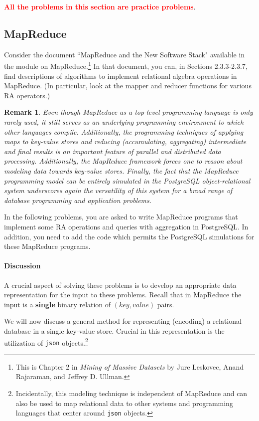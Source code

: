 \documentclass[10pt]{article}
\newtheorem{remark}{Remark}
\begin{document}
\textcolor{red}{\bf All the problems in this section are practice problems}.

\subsection{MapReduce}

Consider the document ``MapReduce and the New Software Stack" available in the module on MapReduce.\footnote{This is Chapter 2 in \emph{Mining of Massive Datasets} by
Jure Leskovec, Anand Rajaraman, and Jeffrey D. Ullman.}
In that document, you can, in Sections 2.3.3-2.3.7, find descriptions of
algorithms to implement relational algebra operations in MapReduce.   
(In particular, look at the mapper and reducer functions for various RA operators.)

\begin{remark}
Even though MapReduce as a top-level programming language is only rarely used, it still serves as an underlying
programming environment to which other languages compile.    Additionally, the programming techniques of applying maps to key-value stores
and reducing (accumulating, aggregating) intermediate and final results is an important feature of parallel and distributed data processing.
Additionally, the MapReduce framework forces one to reason about modeling data towards key-value stores.
Finally, the fact that the MapReduce programming model can be entirely simulated in the PostgreSQL object-relational system underscores again the versatility of this system for a broad range of database programming and application problems.
\end{remark}

In the following problems, you are asked to write MapReduce programs
that implement some RA operations and queries with aggregation in PostgreSQL.   In addition, you need to add
the code which permits the PostgreSQL simulations for these  MapReduce programs.   

\paragraph{Discussion}
A crucial aspect of solving these problems is to develop an appropriate data representation for the input 
to these problems.   Recall that in MapReduce the input is a {\bf single} binary relation of $(key,value)$ pairs.

We will now discuss a general method for representing (encoding) a relational database in a single key-value store.
Crucial in this representation is the utilization of {\tt json} objects.\footnote{Incidentally, this modeling technique is independent of
MapReduce and can also be used to map relational data to other systems and programming languages that center around
{\tt json} objects.}
\end{document}
